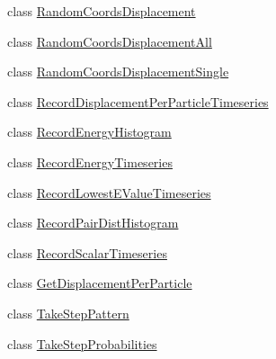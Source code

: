 \begin{DoxyCompactItemize}
class \hyperlink{classmcpele_1_1RandomCoordsDisplacement}{\-Random\-Coords\-Displacement}
\item 
class \hyperlink{classmcpele_1_1RandomCoordsDisplacementAll}{\-Random\-Coords\-Displacement\-All}
\item 
class \hyperlink{classmcpele_1_1RandomCoordsDisplacementSingle}{\-Random\-Coords\-Displacement\-Single}
\item 
class \hyperlink{classmcpele_1_1RecordDisplacementPerParticleTimeseries}{\-Record\-Displacement\-Per\-Particle\-Timeseries}
\item 
class \hyperlink{classmcpele_1_1RecordEnergyHistogram}{\-Record\-Energy\-Histogram}
\item 
class \hyperlink{classmcpele_1_1RecordEnergyTimeseries}{\-Record\-Energy\-Timeseries}
\item 
class \hyperlink{classmcpele_1_1RecordLowestEValueTimeseries}{\-Record\-Lowest\-E\-Value\-Timeseries}
\item 
class \hyperlink{classmcpele_1_1RecordPairDistHistogram}{\-Record\-Pair\-Dist\-Histogram}
\item 
class \hyperlink{classmcpele_1_1RecordScalarTimeseries}{\-Record\-Scalar\-Timeseries}
\item 
class \hyperlink{classmcpele_1_1GetDisplacementPerParticle}{\-Get\-Displacement\-Per\-Particle}
\item 
class \hyperlink{classmcpele_1_1TakeStepPattern}{\-Take\-Step\-Pattern}
\item 
class \hyperlink{classmcpele_1_1TakeStepProbabilities}{\-Take\-Step\-Probabilities}
\end{DoxyCompactItemize}
